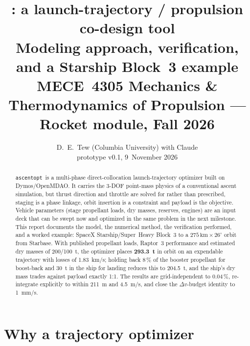 \documentclass[11pt,a4paper]{article}
\title{\textbf{\tool: a launch-trajectory / propulsion co-design tool}\\[4pt]
\large Modeling approach, verification, and a Starship Block~3 example\\[2pt]
\normalsize MECE~4305 Mechanics \& Thermodynamics of Propulsion --- Rocket module, Fall 2026}
\author{D.~E.~Tew (Columbia University) with Claude\\ \small prototype v0.1, 9~November 2026}
\date{}
\newcommand{\tool}{\texttt{ascentopt}}
\newcommand{\dv}{\Delta v}
\newcommand{\unit}[1]{\,\mathrm{#1}}
\begin{document}
\maketitle

\begin{abstract}
\noindent\tool\ is a multi-phase direct-collocation launch-trajectory optimizer built on Dymos/OpenMDAO. It
carries the 3-DOF point-mass physics of a conventional ascent simulation, but thrust direction and throttle
are solved for rather than prescribed, staging is a phase linkage, orbit insertion is a constraint and payload
is the objective. Vehicle parameters (stage propellant loads, dry masses, reserves, engines) are
an input deck that can be swept now and optimized in the same problem in the next milestone. This report
documents the model, the numerical method, the verification performed, and a worked example: SpaceX
Starship/Super~Heavy Block~3 to a $275\unit{km}\times26^\circ$ orbit from Starbase. With published propellant loads,
Raptor~3 performance and estimated dry masses of 200/100~t, the optimizer places
\textbf{293.3~t} in orbit on an expendable trajectory with losses of 1.83~km/s; holding back 8\,\% of the
booster propellant for boost-back and 30~t in the ship for landing reduces this to 204.5~t, and the ship's dry
mass trades against payload exactly 1:1. The results are grid-independent to 0.04\,\%, re-integrate explicitly
to within 211~m and 4.5~m/s, and close the $\dv$-budget identity to 1~mm/s.
\end{abstract}

\section{Why a trajectory optimizer}
\label{sec:why}
\end{document}
